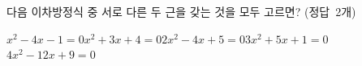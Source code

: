 다음 이차방정식 중 서로 다른 두 근을 갖는 것을 모두 고르면? \mbox{(정답 2개)}
\begin{choices32}{$x^2-4x-1=0$}{$x^2+3x+4=0$}{$2x^2-4x+5=0$}{$3x^2+5x+1=0$}{$4x^2-12x+9=0$}\end{choices32}
